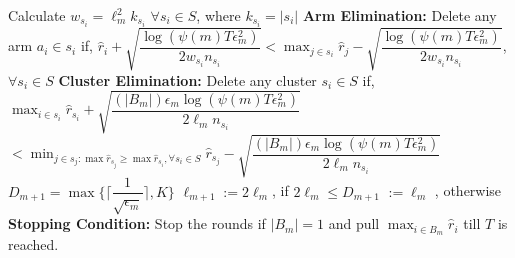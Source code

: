 \begin{algorithmic}[1]
\State \hspace*{2em} Calculate $w_{s_{i}}=\ell_{m}^{2}k_{s_{i}}$ $\forall s_{i}\in S$, where $k_{s_{i}}=|s_{i}|$
\State \hspace*{2em} \textbf{Arm Elimination:}
\State \hspace*{2em} Delete any arm $a_{i}\in s_{i}$ if,
\newline\hspace*{2em}$\hat{r}_{i} + \sqrt{\dfrac{\log{(\psi(m)T\epsilon_{m}^{2})}}{2w_{s_{i}}n_{s_{i}}}}  < \max_{j\in s_{i}}\hat{r}_{j} -\sqrt{\dfrac{\log{(\psi(m)T\epsilon_{m}^{2})}}{2w_{s_{i}}n_{s_{i}}}} $, $\forall s_{i}\in S$ 
\State \hspace*{2em} \textbf{Cluster Elimination:}
\State \hspace*{2em} Delete any cluster $s_{i}\in S$ if, $\max_{i\in s_{i}}\hat{r}_{s_{i}} + \sqrt{\dfrac{(|B_{m}|)\epsilon_{m}\log{(\psi(m)T\epsilon_{m}^{2})}}{2\ell_{m} n_{s_{i}}}}  $\newline\hspace*{4em}$< \min_{j\in s_{j}:\max{\hat{r}_{s_{j}}}\geq \max\hat{r}_{s_{i}},\forall s_{i}\in S}\hat{r}_{s_{j}} - \sqrt{\dfrac{(|B_{m}|)\epsilon_{m}\log{(\psi(m)T\epsilon_{m}^{2})}}{2\ell_{m} n_{s_{i}}}}$
\State \hspace*{2em} $D_{m+1}=\max{\bigg\lbrace\bigg\lceil\dfrac{1}{\sqrt{\epsilon_{m}}}\bigg\rceil,K\bigg\rbrace}$
\State \hspace*{2em} $\ell_{m+1}:=2\ell_{m}$, if $2\ell_{m}\leq D_{m+1}$
\newline\hspace*{4.9em}$:=\ell_{m}$ , otherwise
\State \hspace*{2em} \textbf{Stopping Condition:} 
\State \hspace*{2em} Stop the rounds if $|B_{m}|=1$ and pull $\max_{i\in B_{m}}\hat{r}_{i}$ till $T$ is reached.
\end{algorithmic}
\noindent\makebox[\linewidth]{\rule{\textwidth}{0.4pt}}\\[-0.6cm]

